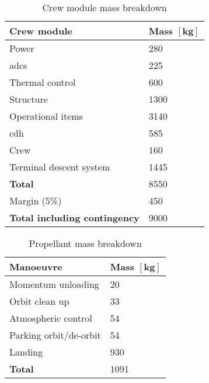 \begin{table}[H]
	\centering
	\caption{Crew module mass breakdown}
	\label{tab:CrewModuleMass}
	\begin{tabular}{|p{}|p{}|} \hline
		\textbf {Crew module}             & \textbf{Mass $\mathbf{[kg]}$ } \\ \hline \hline
		Power        &		 280       \\ \hline
		\gls{adcs} &		  225      \\ \hline
		Thermal control & 600\\ \hline
		Structure & 1300\\ \hline
		Operational items & 3140\\ \hline
		\acrlong{cdh} & 585 \\ \hline
		Crew & 160 \\ \hline
		Terminal descent system           		   &  1445      \\ \hline \hline
		\textbf{Total}             	   &  8550     \\ \hline
		Margin (5\%) & 450							\\ \hline
		\textbf {Total including contingency}                 &  9000      \\ \hline
	\end{tabular}
\end{table}

\begin{table}[H]
	\centering
	\caption{Propellant mass breakdown}
	\label{tab:PropMass}
	\begin{tabular}{|p{}|p{}|} \hline
		\textbf {Manoeuvre}             & \textbf{Mass $\mathbf{[kg]}$ } \\ \hline \hline
		Momentum unloading       &		 20       \\ \hline
		Orbit clean up &		  33      \\ \hline
		Atmospheric control           		   &  54      \\ \hline 
		Parking orbit/de-orbit            	   & 54    \\ \hline
		Landing            	   &  930     \\ \hline \hline
		\textbf {Total}                 &  1091      \\ \hline
	\end{tabular}
\end{table}
